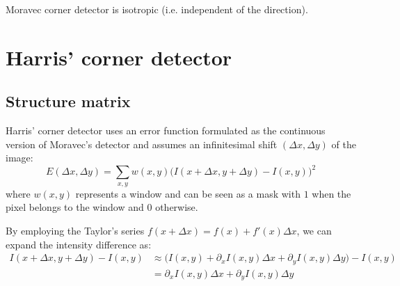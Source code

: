 \begin{remark}
    Moravec corner detector is isotropic (i.e. independent of the direction).
\end{remark}



\section{Harris' corner detector}

\subsection{Structure matrix}

Harris' corner detector uses an error function formulated as the continuous version of Moravec's detector and 
assumes an infinitesimal shift $(\Delta x, \Delta y)$ of the image:
\[ E(\Delta x, \Delta y) = \sum_{x, y} w(x, y) \big( I(x+\Delta x, y+\Delta y) - I(x, y) \big)^2 \]
where $w(x, y)$ represents a window and can be seen as a mask with $1$ when the pixel belongs to the window and $0$ otherwise.

By employing the Taylor's series $f(x + \Delta x) = f(x) + f'(x) \Delta x$,
we can expand the intensity difference as:
\[ 
    \begin{split}
        I(x+\Delta x, y+\Delta y) - I(x, y) &\approx \big( I(x, y) + \partial_x I(x, y)\Delta x + \partial_y I(x, y)\Delta y \big) - I(x, y) \\
        &= \partial_x I(x, y)\Delta x + \partial_y I(x, y)\Delta y
    \end{split}
\]

